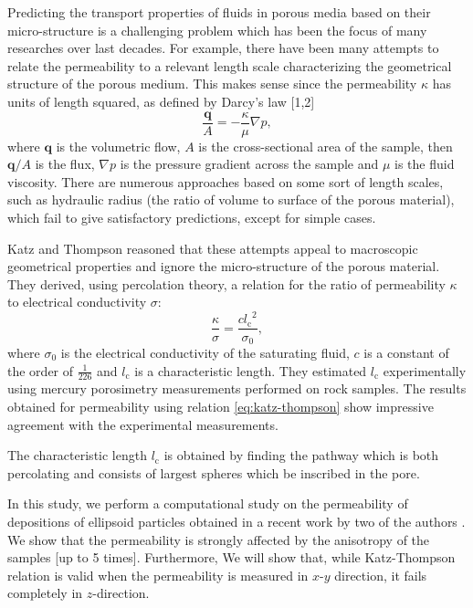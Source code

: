 \documentclass[aps,twocolumn,superscriptaddress,showpacs,showkeys]{revtex4-1}
\newcommand{\vbf}[1]{\mathbf{#1}}
\newcommand{\lc}{{l_{\mathrm{c}}}}  %
\newcommand{\dpl}{\nabla p}         %
\newcommand{\q}{\vbf{q}}            %
\newcommand{\area}{A}               %
\begin{document}

Predicting the transport properties of fluids in porous media based on their
micro-structure is a challenging problem which has been the focus of many
researches over last decades.  For example, there have been many attempts to
relate the permeability to a relevant length scale characterizing the
geometrical structure of the porous medium.  This makes sense since the
permeability $\kappa$ has units of length squared, as defined by Darcy's law
[1,2] %
\begin{equation}
\frac{\q}{\area} = -\frac{\kappa}{\mu} \dpl,
\end{equation}
where $\q$ is the volumetric flow, $\area$ is the cross-sectional area of the
sample, then $\q/\area$ is the flux, $\dpl$ is the pressure gradient across
the sample and $\mu$ is the fluid viscosity.  There are numerous approaches
based on some sort of length scales, such as hydraulic radius (the ratio of
volume to surface of the porous material), which fail to give satisfactory
predictions, except for simple cases.

Katz and Thompson \cite{ref:KatzThompson1986} reasoned that these attempts
appeal to macroscopic geometrical properties and ignore the micro-structure of
the porous material.  They derived, using percolation theory, a relation for
the ratio of permeability $\kappa$ to electrical conductivity $\sigma$:
\begin{equation}
\frac{\kappa}{\sigma} = \frac{c \lc^2}{\sigma_0},
\label{eq:katz-thompson}
\end{equation}
where $\sigma_0$ is the electrical conductivity of the saturating fluid, $c$
is a constant of the order of $\frac{1}{226}$ and $\lc$ is a characteristic
length.  They estimated $\lc$ experimentally using mercury porosimetry
measurements performed on rock samples.  The results obtained for permeability
using relation \ref{eq:katz-thompson} show impressive agreement with the
experimental measurements.

The characteristic length $\lc$ is obtained by finding the pathway which is
both percolating and consists of largest spheres which be inscribed in the
pore.

In this study, we perform a computational study on the permeability of
depositions of ellipsoid particles obtained in a recent work by two of the
authors \cite{ref:reza-pedro2011}.  We show that the permeability is strongly
affected by the anisotropy of the samples [up to 5 times].  Furthermore, We
will show that, while Katz-Thompson relation is valid when the permeability is
measured in $x$-$y$ direction, it fails completely in $z$-direction.
\end{document}
